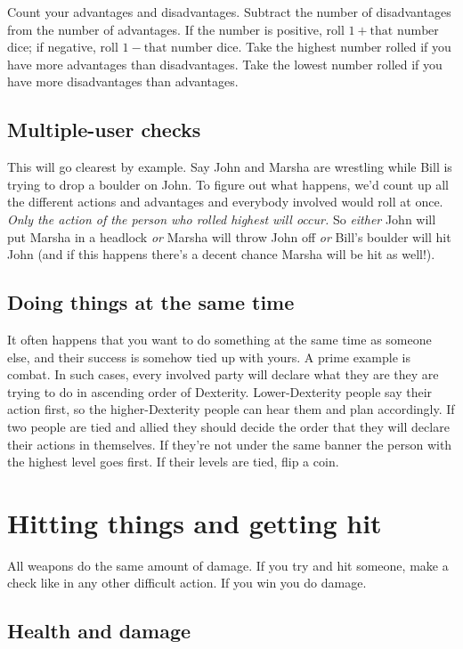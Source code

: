\documentclass[twocolumn]{amsart}
\begin{document}
Count your advantages and disadvantages.
Subtract the number of disadvantages from the number of advantages.
If the number is positive, roll $1+\text{that number}$ dice; if negative, roll $1 - \text{that number}$ dice.
Take the highest number rolled if you have more advantages than disadvantages.
Take the lowest number rolled if you have more disadvantages than advantages.

\subsection{Multiple-user checks}
This will go clearest by example.
Say John and Marsha are wrestling while Bill is trying to drop a boulder on John.
To figure out what happens, we'd count up all the different actions and advantages and everybody involved would roll at once.
\emph{Only the action of the person who rolled highest will occur.}
So \emph{either} John will put Marsha in a headlock \emph{or} Marsha will throw John off \emph{or} Bill's boulder will hit John (and if this happens there's a decent chance Marsha will be hit as well!).

\subsection{Doing things at the same time}
It often happens that you want to do something at the same time as someone else, and their success is somehow tied up with yours.
A prime example is combat.
In such cases, every involved party will declare what they are they are trying to do in ascending order of Dexterity.
Lower-Dexterity people say their action first, so the higher-Dexterity people can hear them and plan accordingly.
If two people are tied and allied they should decide the order that they will declare their actions in themselves.
If they're not under the same banner the person with the highest level goes first.
If their levels are tied, flip a coin.

\section{Hitting things and getting hit}\label{weapon}

All weapons do the same amount of damage.
If you try and hit someone, make a check like in any other difficult action.
If you win you do damage.

\subsection{Health and damage}
\end{document}
